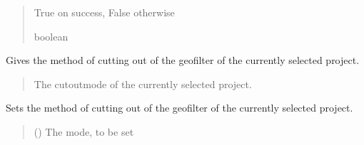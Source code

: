 \documentclass[letterpaper,10pt,english]{sphinxmanual}
\begin{document}
\begin{fulllineitems}
\begin{fulllineitems}
\begin{quote}
\begin{description}
\sphinxAtStartPar
True on success, False otherwise

\sphinxAtStartPar
boolean

\end{description}\end{quote}

\end{fulllineitems}


\begin{fulllineitems}
\label{\detokenize{apidoc/src.osm_configurator.control:src.osm_configurator.control.control_interface.IControl.get_cut_out_mode}}
\pysigstartsignatures
{}
\pysigstopsignatures
\sphinxAtStartPar
Gives the method of cutting out of the geofilter of the currently selected project.
\begin{quote}\begin{description}
\sphinxAtStartPar
The cut\sphinxhyphen{}out\sphinxhyphen{}mode of the currently selected project.

\sphinxAtStartPar
{\hyperref[\detokenize{apidoc/src.osm_configurator.model.project.configuration:src.osm_configurator.model.project.configuration.cut_out_mode_enum.CutOutMode}]{}}

\end{description}\end{quote}

\end{fulllineitems}


\begin{fulllineitems}
\label{\detokenize{apidoc/src.osm_configurator.control:src.osm_configurator.control.control_interface.IControl.set_cut_out_mode}}
\pysigstartsignatures
{}
\pysigstopsignatures
\sphinxAtStartPar
Sets the method of cutting out of the geofilter of the currently selected project.
\begin{quote}\begin{description}
\sphinxAtStartPar
{} ({\hyperref[\detokenize{apidoc/src.osm_configurator.model.project.configuration:src.osm_configurator.model.project.configuration.cut_out_mode_enum.CutOutMode}]{}}) \textendash{} The mode, to be set


\end{description}
\end{quote}
\end{fulllineitems}
\end{fulllineitems}
\end{document}
